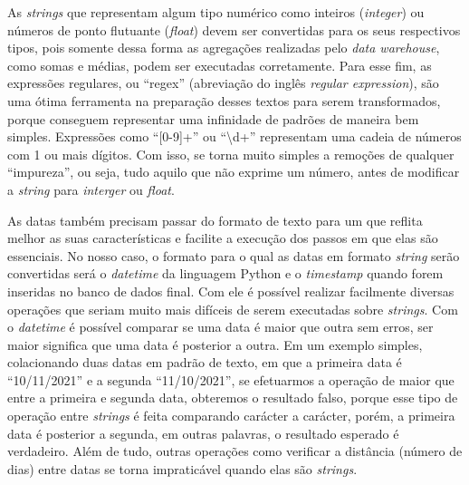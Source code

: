 As \textit{strings} que representam algum tipo numérico como inteiros (\textit{integer}) ou números de ponto flutuante (\textit{float}) devem ser convertidas para os seus respectivos tipos, pois somente dessa forma as agregações realizadas pelo \textit{data warehouse}, como somas e médias, podem ser executadas corretamente. Para esse fim, as expressões regulares, ou \enquote{regex} (abreviação do inglês \textit{regular expression}), são uma ótima ferramenta na preparação desses textos para serem transformados, porque conseguem representar uma infinidade de padrões de maneira bem simples. Expressões como \enquote{[0-9]+} ou \enquote{\textbackslash d+} representam uma cadeia de números com 1 ou mais dígitos. Com isso, se torna muito simples a remoções de qualquer \enquote{impureza}, ou seja, tudo aquilo que não exprime um número, antes de modificar a \textit{string} para \textit{interger} ou \textit{float}.

As datas também precisam passar do formato de texto para um que reflita melhor as suas características e facilite a execução dos passos em que elas são essenciais. No nosso caso, o formato para o qual as datas em formato \textit{string} serão convertidas será o \textit{datetime} da linguagem Python e o \textit{timestamp} quando forem inseridas no banco de dados final. Com ele é possível realizar facilmente diversas operações que seriam muito mais difíceis de serem executadas sobre \textit{strings}. Com o \textit{datetime} é possível comparar se uma data é maior que outra sem erros, ser maior significa que uma data é posterior a outra. Em um exemplo simples, colacionando duas datas em padrão de texto, em que a primeira data é \enquote{10/11/2021} e a segunda \enquote{11/10/2021}, se efetuarmos a operação de maior que entre a primeira e segunda data, obteremos o resultado falso, porque esse tipo de operação entre \textit{strings} é feita comparando carácter a carácter, porém, a primeira data é posterior a segunda, em outras palavras, o resultado esperado é verdadeiro. Além de tudo, outras operações como verificar a distância (número de dias) entre datas se torna impraticável quando elas são \textit{strings}.


